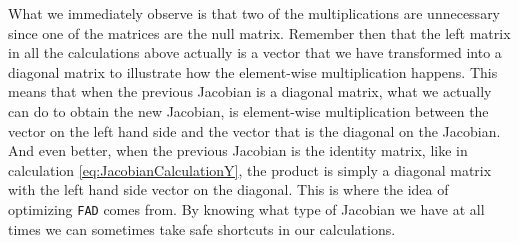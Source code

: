 What we immediately observe is that two of the multiplications are unnecessary since one of the matrices are the null matrix. Remember then that the left matrix in all the calculations above actually is a vector that we have transformed into a diagonal matrix to illustrate how the element-wise multiplication happens. This means that when the previous Jacobian is a diagonal matrix, what we actually can do to obtain the new Jacobian, is element-wise multiplication between the vector on the left hand side and the vector that is the diagonal on the Jacobian. And even better, when the previous Jacobian is the identity matrix, like in calculation \eqref{eq:JacobianCalculationY}, the product is simply a diagonal matrix with the left hand side vector on the diagonal. This is where the idea of optimizing \texttt{FAD} comes from. By knowing what type of Jacobian we have at all times we can sometimes take safe shortcuts in our calculations. 

